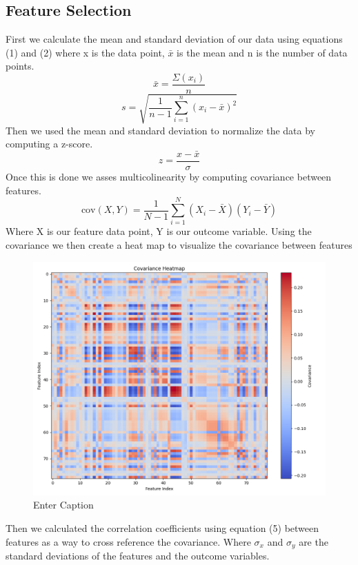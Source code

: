\documentclass{article}
\begin{document}
\subsection{Feature Selection}
First we calculate the mean and standard deviation of our data using equations (1) and (2) where x is the data point, $\bar{x}$ is the mean and n is the number of data points.  
\begin{equation} \bar{x} = \frac{\Sigma(x_i)}{n} \end{equation}
\begin{equation} s = \sqrt{\frac{1}{n-1} \sum_{i=1}^{n} \left(x_i - \bar{x} \right)^2} \end{equation}
Then we used the mean and standard deviation to normalize the data by computing a z-score. 
\begin{equation} z = \frac{x - \bar{x}}{ \sigma}\end{equation}
Once this is done we asses multicolinearity by computing covariance between features.
\begin{equation} \text{cov}(X, Y) = \frac{1}{N - 1} \sum_{i=1}^N \left( X_i - \bar{X} \right)\left( Y_i - \bar{Y} \right) \end{equation}
Where X is our feature data point, Y is our outcome variable. Using the covariance we then create a heat map to visualize the covariance between features

\begin{figure}[h]
    \centering
    \includegraphics[width=0.5\linewidth]{covarheat.png}
    \caption{Enter Caption}
    \label{fig:placeholder}
\end{figure}

\begin{noindent}
Then we calculated the correlation coefficients using equation (5) between features as a way to cross reference the covariance. Where $\sigma_x$ and $\sigma_y$ are the standard deviations of the features and the outcome variables.
\end{noindent}
\end{document}
